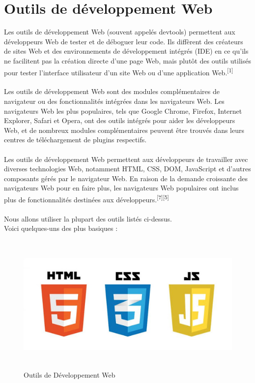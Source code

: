 \documentclass[12pt]{report}
\begin{document}
\newpage

\section{Outils de développement Web}
\vspace{0.2in}
Les outils de développement Web (souvent appelés devtools) permettent aux développeurs Web de tester et de déboguer leur code. Ils diffèrent des créateurs de sites Web et des environnements de développement intégrés (IDE) en ce qu'ils ne facilitent pas la création directe d'une page Web, mais plutôt des outils utilisés pour tester l'interface utilisateur d'un site Web ou d'une application Web.\textsuperscript{[1]}
\\\\
Les outils de développement Web sont des modules complémentaires de navigateur ou des fonctionnalités intégrées dans les navigateurs Web. Les navigateurs Web les plus populaires, tels que Google Chrome, Firefox, Internet Explorer, Safari et Opera, ont des outils intégrés pour aider les développeurs Web, et de nombreux modules complémentaires peuvent être trouvés dans leurs centres de téléchargement de plugins respectifs.
\\\\
Les outils de développement Web permettent aux développeurs de travailler avec diverses technologies Web, notamment HTML, CSS, DOM, JavaScript et d'autres composants gérés par le navigateur Web. En raison de la demande croissante des navigateurs Web pour en faire plus, les navigateurs Web populaires ont inclus plus de fonctionnalités destinées aux développeurs.\textsuperscript{[7][5]}
\\\\
Nous allons utiliser la plupart des outils listés ci-dessus.
\\
Voici quelques-uns des plus basiques :

\vspace{0.2in}

\begin{figure}[h]
\centering
    \includegraphics[width = 6in, height = 2.7in]{../Images/webDevTools.jpg}
\caption{Outils de Développement Web}
\end{figure}
\end{document}
